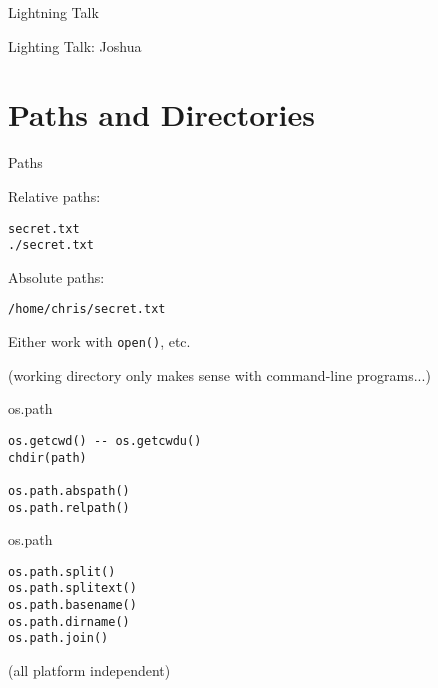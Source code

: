 \documentclass{beamer}
\begin{document}
%
%

\begin{frame}{Lightning Talk}

{\center

\LARGE Lighting Talk:
\vfill
Joshua
\vfill

}
\end{frame}

\section{Paths and Directories}

\begin{frame}[fragile]{Paths}

{\Large Relative paths:}

\begin{verbatim}
secret.txt
./secret.txt
\end{verbatim}

{\Large Absolute paths:}
\begin{verbatim}
/home/chris/secret.txt
\end{verbatim}

{\Large Either work with \verb|open()|, etc.}

\vfill
(working directory only makes sense with command-line programs...)
\end{frame}

\begin{frame}[fragile]{os.path}

\begin{verbatim}
os.getcwd() -- os.getcwdu()
chdir(path)

os.path.abspath()
os.path.relpath()￼
\end{verbatim}

\end{frame}

\begin{frame}[fragile]{os.path}

\vfill
\begin{verbatim}
os.path.split()
os.path.splitext()
os.path.basename()
os.path.dirname()
os.path.join()
\end{verbatim}

\vfill
(all platform independent)

\end{frame}
\end{document}

